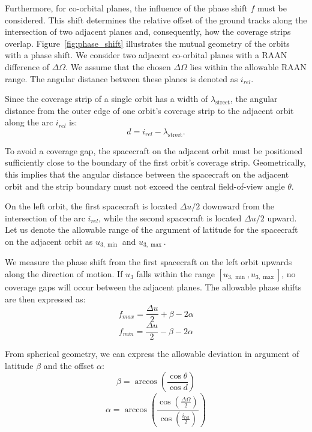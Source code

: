 Furthermore, for co-orbital planes, the influence of the phase shift \(f\) must be considered. This
shift determines the relative offset of the ground tracks along the intersection of two adjacent
planes and, consequently, how the coverage strips overlap. Figure~\ref{fig:phase_shift} illustrates
the mutual geometry of the orbits with a phase shift. We consider two adjacent co-orbital planes
with a RAAN difference of $\Delta\Omega$. We assume that the chosen $\Delta\Omega$ lies within the
allowable RAAN range. The angular distance between these planes is denoted as $i_{rel}$.

Since the coverage strip of a single orbit has a width of $\lambda_{\text{street}}$, the angular
distance from the outer edge of one orbit's coverage strip to the adjacent orbit along the arc
$i_{rel}$ is:
\begin{equation}
    d = i_{rel} - \lambda_{\text{street}}.
\end{equation}

To avoid a coverage gap, the spacecraft on the adjacent orbit must be positioned sufficiently close
to the boundary of the first orbit's coverage strip. Geometrically, this implies that the angular
distance between the spacecraft on the adjacent orbit and the strip boundary must not exceed the
central field-of-view angle $\theta$.

On the left orbit, the first spacecraft is located \(\Delta u/2\) downward from the intersection of
the arc \(i_{rel}\), while the second spacecraft is located \(\Delta u/2\) upward. Let us denote the
allowable range of the argument of latitude for the spacecraft on the adjacent orbit as
\(u_{3,\min}\) and \(u_{3,\max}\).

We measure the phase shift from the first spacecraft on the left orbit upwards along the direction
of motion. If \(u_3\) falls within the range \([u_{3,\min}, u_{3,\max}]\), no coverage gaps will
occur between the adjacent planes. The allowable phase shifts are then expressed as:
\begin{equation}\label{eq:phase_shift}
    f_{max} = \frac{\Delta u}{2} + \beta - 2\alpha
\end{equation}
\begin{equation}
    f_{min} = \frac{\Delta u}{2} - \beta - 2\alpha
\end{equation}

From spherical geometry, we can express the allowable deviation in argument of latitude $\beta$ and
the offset $\alpha$:
\begin{equation}
    \beta = \arccos \left(  \frac{\cos \theta}{\cos d} \right)
\end{equation}
\begin{equation}
    \alpha = \arccos \left( \frac{\cos(\frac{\Delta\Omega}{2})}{\cos(\frac{i_{rel}}{2})} \right)
\end{equation}

